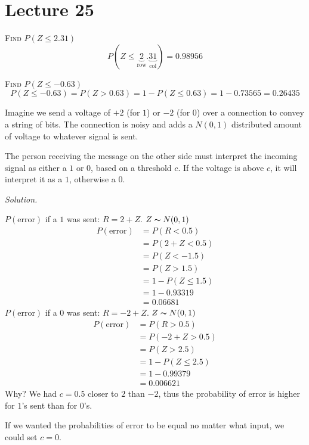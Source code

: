 \section{Lecture 25}
\textsc{Find $ P(Z\le 2.31) $}
\[ P(Z\le \underbrace{2}_{\text{row}}.\underbrace{31}_{\text{col}})=0.98956 \]

\textsc{Find $ P(Z\le-0.63) $}
\[ P(Z\le-0.63)=P(Z>0.63)=1-P(Z\le 0.63)=1-0.73565=0.26435\]


Imagine we send a voltage of $ +2 $ (for $ 1 $) or $ -2 $ (for $ 0 $) over
a connection to convey a string of bits. The connection is noisy and adds
a $ N(0,1) $ distributed amount of voltage to whatever signal is sent.

The person receiving the message on the other side must interpret the incoming
signal as either a $ 1 $ or $ 0 $, based on a threshold $ c $. If the voltage
is above $ c $, it will interpret it as a $ 1 $, otherwise a $ 0 $.


\emph{Solution.}

$ P(\text{error}) $ if a $ 1 $ was sent: $ R =2+Z $. $ Z \thicksim N(0,1) $
\begin{align*}
    P(\text{error})&=P(R<0.5)\\
    &=P(2+Z<0.5)\\
    &=P(Z<-1.5)\\
    &=P(Z> 1.5)\\
    &=1-P(Z\le 1.5)\\
    &=1-0.93319\\
    &=0.06681
\end{align*}
$ P(\text{error}) $ if a $ 0 $ was sent: $ R=-2+Z $. $ Z \thicksim N(0,1) $
\begin{align*}
    P(\text{error})&=P(R>0.5)\\
    &=P(-2+Z>0.5)\\
    &=P(Z>2.5)\\
    &=1-P(Z\le 2.5)\\
    &=1-0.99379\\
    &=0.006621
\end{align*}
Why? We had $ c=0.5 $ closer to $ 2 $ than $ -2 $, thus the probability
of error is higher for $ 1 $'s sent than for $ 0 $'s.

If we wanted the probabilities of error to be equal no matter what input,
we could set $ c=0 $.

